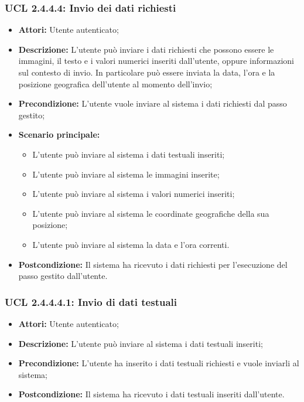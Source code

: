 \subsubsection{UCL 2.4.4.4: Invio dei dati richiesti}
\begin{itemize}
\item \textbf{Attori:} Utente autenticato;
\item \textbf{Descrizione:} L'utente può inviare i dati richiesti che possono essere le immagini, il testo e i valori numerici inseriti dall'utente, oppure informazioni sul contesto di invio. In particolare può essere inviata la data, l'ora e la posizione geografica dell'utente al momento dell'invio;
\item \textbf{Precondizione:} L'utente vuole inviare al sistema i dati richiesti dal passo gestito;
\item \textbf{Scenario principale:}
\begin{itemize}
\item L'utente può inviare al sistema i dati testuali inseriti;
\item L'utente può inviare al sistema le immagini inserite;
\item L'utente può inviare al sistema i valori numerici inseriti;
\item L'utente può inviare al sistema le coordinate geografiche della sua posizione;
\item L'utente può inviare al sistema la data e l'ora correnti.
\end{itemize}
\item \textbf{Postcondizione:} Il sistema ha ricevuto i dati richiesti per l'esecuzione del passo gestito dall'utente.
\end{itemize}

\hypertarget{L2.4.4.4.1}{}
\subsubsection{UCL 2.4.4.4.1: Invio di dati testuali}
\begin{itemize}
\item \textbf{Attori:} Utente autenticato;
\item \textbf{Descrizione:} L'utente può inviare al sistema i dati testuali inseriti;
\item \textbf{Precondizione:} L'utente ha inserito i dati testuali richiesti e vuole inviarli al sistema;
\item \textbf{Postcondizione:} Il sistema ha ricevuto i dati testuali inseriti dall'utente.
\end{itemize}

